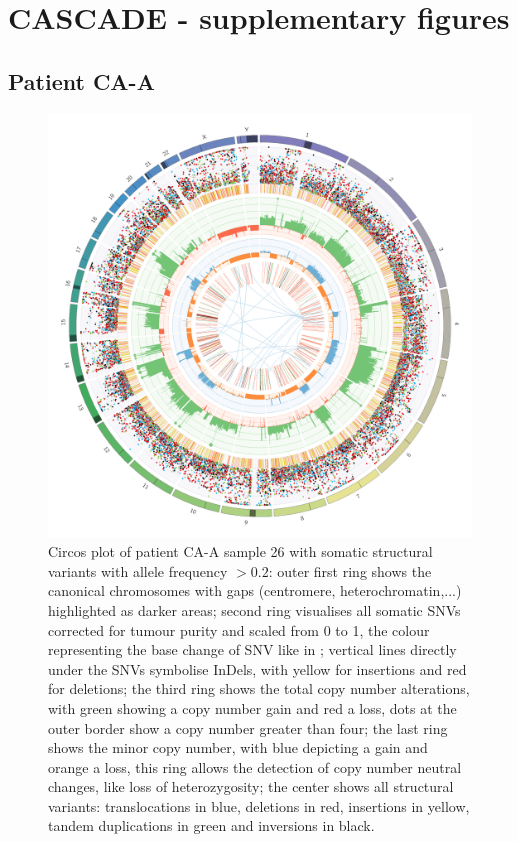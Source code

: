 \chapter*{CASCADE - supplementary figures}
\label{ch-cascadeSuppFig}


\section{Patient CA-A}

\begin{figure}[!ht]
\centering
\includegraphics[width=.99\linewidth]{Figures/CASCADE/CA99/CA99-26.circos.png}
\caption[Circos plot of patient CA-A sample 26]{Circos plot of patient CA-A sample 26 with somatic structural variants with allele frequency $> 0.2$: outer first ring shows the canonical chromosomes with gaps (centromere, heterochromatin,...) highlighted as darker areas; second ring visualises all somatic SNVs corrected for tumour purity and scaled from 0 to 1, the colour representing the base change of SNV like in \protect\textcite{Alexandrov2013}; vertical lines directly under the SNVs symbolise InDels, with yellow for insertions and red for deletions; the third ring shows the total copy number alterations, with green showing a copy number gain and red a loss, dots at the outer border show a copy number greater than four; the last ring shows the minor copy number, with blue depicting a gain and orange a loss, this ring allows the detection of copy number neutral changes, like loss of heterozygosity; the center shows all structural variants: translocations in blue, deletions in red, insertions in yellow, tandem duplications in green and inversions in black.} \label{fig:ca99.26circos}
\end{figure}


